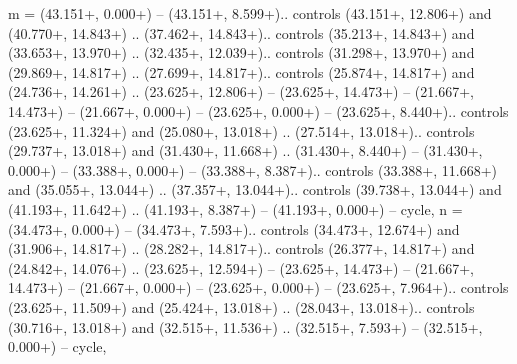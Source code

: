 {m} = {(43.151+\ctpXshift, 0.000+\ctpYshift) -- (43.151+\ctpXshift, 8.599+\ctpYshift).. controls (43.151+\ctpXshift, 12.806+\ctpYshift) and (40.770+\ctpXshift, 14.843+\ctpYshift) .. (37.462+\ctpXshift, 14.843+\ctpYshift).. controls (35.213+\ctpXshift, 14.843+\ctpYshift) and (33.653+\ctpXshift, 13.970+\ctpYshift) .. (32.435+\ctpXshift, 12.039+\ctpYshift).. controls (31.298+\ctpXshift, 13.970+\ctpYshift) and (29.869+\ctpXshift, 14.817+\ctpYshift) .. (27.699+\ctpXshift, 14.817+\ctpYshift).. controls (25.874+\ctpXshift, 14.817+\ctpYshift) and (24.736+\ctpXshift, 14.261+\ctpYshift) .. (23.625+\ctpXshift, 12.806+\ctpYshift) -- (23.625+\ctpXshift, 14.473+\ctpYshift) -- (21.667+\ctpXshift, 14.473+\ctpYshift) -- (21.667+\ctpXshift, 0.000+\ctpYshift) -- (23.625+\ctpXshift, 0.000+\ctpYshift) -- (23.625+\ctpXshift, 8.440+\ctpYshift).. controls (23.625+\ctpXshift, 11.324+\ctpYshift) and (25.080+\ctpXshift, 13.018+\ctpYshift) .. (27.514+\ctpXshift, 13.018+\ctpYshift).. controls (29.737+\ctpXshift, 13.018+\ctpYshift) and (31.430+\ctpXshift, 11.668+\ctpYshift) .. (31.430+\ctpXshift, 8.440+\ctpYshift) -- (31.430+\ctpXshift, 0.000+\ctpYshift) -- (33.388+\ctpXshift, 0.000+\ctpYshift) -- (33.388+\ctpXshift, 8.387+\ctpYshift).. controls (33.388+\ctpXshift, 11.668+\ctpYshift) and (35.055+\ctpXshift, 13.044+\ctpYshift) .. (37.357+\ctpXshift, 13.044+\ctpYshift).. controls (39.738+\ctpXshift, 13.044+\ctpYshift) and (41.193+\ctpXshift, 11.642+\ctpYshift) .. (41.193+\ctpXshift, 8.387+\ctpYshift) -- (41.193+\ctpXshift, 0.000+\ctpYshift) -- cycle},
{n} = {(34.473+\ctpXshift, 0.000+\ctpYshift) -- (34.473+\ctpXshift, 7.593+\ctpYshift).. controls (34.473+\ctpXshift, 12.674+\ctpYshift) and (31.906+\ctpXshift, 14.817+\ctpYshift) .. (28.282+\ctpXshift, 14.817+\ctpYshift).. controls (26.377+\ctpXshift, 14.817+\ctpYshift) and (24.842+\ctpXshift, 14.076+\ctpYshift) .. (23.625+\ctpXshift, 12.594+\ctpYshift) -- (23.625+\ctpXshift, 14.473+\ctpYshift) -- (21.667+\ctpXshift, 14.473+\ctpYshift) -- (21.667+\ctpXshift, 0.000+\ctpYshift) -- (23.625+\ctpXshift, 0.000+\ctpYshift) -- (23.625+\ctpXshift, 7.964+\ctpYshift).. controls (23.625+\ctpXshift, 11.509+\ctpYshift) and (25.424+\ctpXshift, 13.018+\ctpYshift) .. (28.043+\ctpXshift, 13.018+\ctpYshift).. controls (30.716+\ctpXshift, 13.018+\ctpYshift) and (32.515+\ctpXshift, 11.536+\ctpYshift) .. (32.515+\ctpXshift, 7.593+\ctpYshift) -- (32.515+\ctpXshift, 0.000+\ctpYshift) -- cycle},
